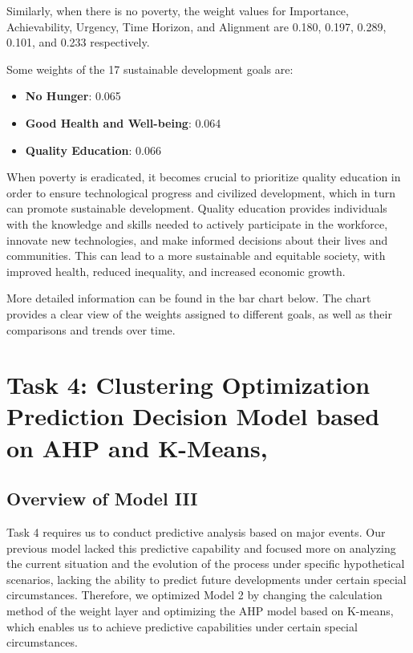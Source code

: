 Similarly, when there is no poverty, the weight values for Importance, Achievability, Urgency, Time Horizon, and Alignment are 0.180, 0.197, 0.289, 0.101, and 0.233 respectively.

Some weights of the 17 sustainable development goals are:
\begin{itemize}
    \item \textbf{No Hunger}: 0.065
    \item \textbf{Good Health and Well-being}: 0.064
    \item \textbf{Quality Education}: 0.066
\end{itemize}



When poverty is eradicated, it becomes crucial to prioritize quality education in order to ensure technological progress and civilized development, which in turn can promote sustainable development. Quality education provides individuals with the knowledge and skills needed to actively participate in the workforce, innovate new technologies, and make informed decisions about their lives and communities. This can lead to a more sustainable and equitable society, with improved health, reduced inequality, and increased economic growth.

More detailed information can be found in the bar chart below. The chart provides a clear view of the weights assigned to different goals, as well as their comparisons and trends over time.





\section{Task 4: Clustering Optimization Prediction Decision Model based on AHP and K-Means,}

\subsection{Overview of Model III}
Task 4 requires us to conduct predictive analysis based on major events. Our previous model lacked this predictive capability and focused more on analyzing the current situation and the evolution of the process under specific hypothetical scenarios, lacking the ability to predict future developments under certain special circumstances. Therefore, we optimized Model 2 by changing the calculation method of the weight layer and optimizing the AHP model based on K-means, which enables us to achieve predictive capabilities under certain special circumstances.

